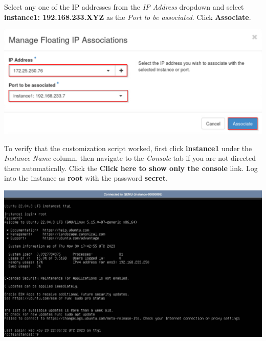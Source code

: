 \documentclass[letterpaper, 12pt]{article}
\begin{document}
\begin{enumerate}
    \begin{labstep}
        Select any one of the IP addresses from the \textit{IP Address} dropdown and select \textbf{instance1: 192.168.233.XYZ} as the \textit{Port to be associated}.
        Click \textbf{Associate}.

        \begin{center}
            \includegraphics[width=\linewidth]{images/part2/step12.png}
        \end{center}
    \end{labstep}

    \begin{labstep}
        To verify that the customization script worked, first click \textbf{instance1} under the \textit{Instance Name} column, then navigate to the \textit{Console} tab if you are not directed there automatically.
        Click the \textbf{Click here to show only the console} link.
        Log into the instance as \textbf{root} with the password \textbf{secret}.

        \begin{center}
            \includegraphics[width=\linewidth]{images/part2/step13.png}
        \end{center}
    \end{labstep}


\end{enumerate}
\end{document}
